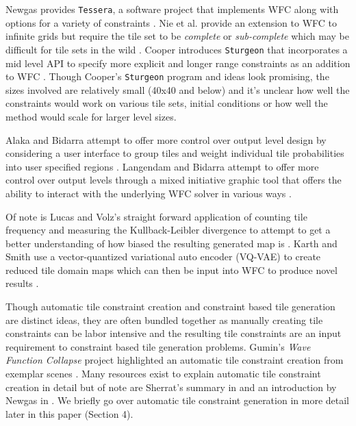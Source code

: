 Newgas provides \texttt{Tessera}, a software project that implements WFC along with options for a variety of constraints \cite{Newgas_2021}.
Nie et al. provide an extension to WFC to infinite grids but require the tile set to be \textit{complete} or \textit{sub-complete}
which may be difficult for tile sets in the wild \cite{Nie_etall_2023}.
Cooper introduces \texttt{Sturgeon} that incorporates a mid level API to specify more explicit and longer range constraints as an addition
to WFC \cite{Cooper_2022}.
Though Cooper's \texttt{Sturgeon} program and ideas look promising, the sizes involved are relatively small (40x40 and below)
and it's unclear how well the constraints would work on various tile sets, initial conditions or how well the method would scale
for larger level sizes.

Alaka and Bidarra attempt to offer more control over output level design by considering a user interface to group tiles and
weight individual tile probabilities into user specified regions \cite{Alaka_Bidarra_Rafael_2023}.
Langendam and Bidarra attempt to offer more control over output levels through a mixed initiative graphic tool that offers
the ability to interact with the underlying WFC solver in various ways \cite{Langendam_etall_2022}.

Of note is Lucas and Volz's straight forward application of counting tile frequency and measuring the Kullback-Leibler divergence
to attempt to get a better understanding of how biased the resulting generated map is \cite{Lucas_Volz_2019}.
Karth and Smith use a vector-quantized variational auto encoder (VQ-VAE) to create reduced tile domain maps which can then
be input into WFC to produce novel results \cite{Karth_Smith_2017}.


Though automatic tile constraint creation and constraint based tile generation are distinct ideas, they are often
bundled together as manually creating tile constraints can be labor intensive and the resulting tile constraints
are an input requirement to constraint based tile generation problems.
Gumin's \textit{Wave Function Collapse} project highlighted an automatic tile constraint creation from exemplar
scenes \cite{Gumin_2016}.
Many resources exist to explain automatic tile constraint creation in detail but of note are Sherrat's summary in
\cite{Sherratt_2019} and an introduction by Newgas in \cite{BorisTheBrave_wfc_2021}.
We briefly go over automatic tile constraint generation in more detail later in this paper (Section 4).

